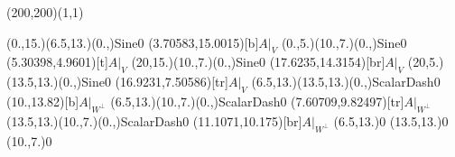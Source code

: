 \unitlength=1bp%

\begin{feynartspicture}(200,200)(1,1)

\FADiagram{}
\FAProp(0.,15.)(6.5,13.)(0.,){Sine}{0}
\FALabel(3.70583,15.0015)[b]{$A|_V$}
\FAProp(0.,5.)(10.,7.)(0.,){Sine}{0}
\FALabel(5.30398,4.9601)[t]{$A|_V$}
\FAProp(20,15.)(10.,7.)(0.,){Sine}{0}
\FALabel(17.6235,14.3154)[br]{$A|_V$}
\FAProp(20,5.)(13.5,13.)(0.,){Sine}{0}
\FALabel(16.9231,7.50586)[tr]{$A|_V$}
\FAProp(6.5,13.)(13.5,13.)(0.,){ScalarDash}{0}
\FALabel(10.,13.82)[b]{$A|_{W^\perp}$}
\FAProp(6.5,13.)(10.,7.)(0.,){ScalarDash}{0}
\FALabel(7.60709,9.82497)[tr]{$A|_{W^\perp}$}
\FAProp(13.5,13.)(10.,7.)(0.,){ScalarDash}{0}
\FALabel(11.1071,10.175)[br]{$A|_{W^\perp}$}
\FAVert(6.5,13.){0}
\FAVert(13.5,13.){0}
\FAVert(10.,7.){0}
\end{feynartspicture}

